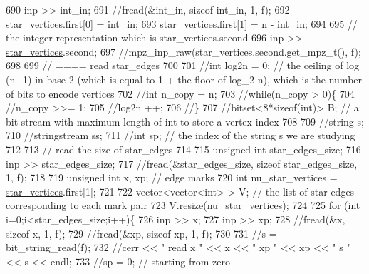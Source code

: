 \begin{DoxyCode}
690   inp >> int\_in;
691   \textcolor{comment}{//fread(&int\_in, sizeof int\_in, 1, f);}
692   \hyperlink{classmarked__graph__compressed_a7a4ced4586e2e353f9076bd447df5208}{star\_vertices}.first[0] = int\_in;
693   \hyperlink{classmarked__graph__compressed_a7a4ced4586e2e353f9076bd447df5208}{star\_vertices}.first[1] = \hyperlink{classmarked__graph__compressed_a8d841016ddb11cfd33748c8deb6277ba}{n} - int\_in;
694 
695   \textcolor{comment}{// the integer representation which is star\_vertices.second}
696   inp >> \hyperlink{classmarked__graph__compressed_a7a4ced4586e2e353f9076bd447df5208}{star\_vertices}.second;
697   \textcolor{comment}{//mpz\_inp\_raw(star\_vertices.second.get\_mpz\_t(), f);}
698 
699   \textcolor{comment}{// ==== read star\_edges}
700 
701   \textcolor{comment}{//int log2n = 0; // the ceiling of log (n+1) in base 2 (which is equal to 1 + the floor of log\_2 n),
       which is the number of bits to encode vertices}
702   \textcolor{comment}{//int n\_copy = n;}
703   \textcolor{comment}{//while(n\_copy > 0)\{}
704   \textcolor{comment}{//n\_copy >>= 1;}
705   \textcolor{comment}{//log2n ++;}
706   \textcolor{comment}{//\}}
707   \textcolor{comment}{//bitset<8*sizeof(int)> B; // a bit stream with maximum length of int to store a vertex index}
708 
709   \textcolor{comment}{//string s;}
710   \textcolor{comment}{//stringstream ss;}
711   \textcolor{comment}{//int sp; // the index of the string s we are studying }
712 
713   \textcolor{comment}{// read the size of star\_edges}
714 
715   \textcolor{keywordtype}{unsigned} \textcolor{keywordtype}{int} star\_edges\_size;
716   inp >> star\_edges\_size;
717   \textcolor{comment}{//fread(&star\_edges\_size, sizeof star\_edges\_size, 1, f);}
718 
719   \textcolor{keywordtype}{unsigned} \textcolor{keywordtype}{int} x, xp; \textcolor{comment}{// edge marks}
720   \textcolor{keywordtype}{int} nu\_star\_vertices = \hyperlink{classmarked__graph__compressed_a7a4ced4586e2e353f9076bd447df5208}{star\_vertices}.first[1];
721 
722   vector<vector<int> > V; \textcolor{comment}{// the list of star edges corresponding to each mark pair}
723   V.resize(nu\_star\_vertices);
724 
725   \textcolor{keywordflow}{for} (\textcolor{keywordtype}{int} i=0;i<star\_edges\_size;i++)\{
726     inp >> x;
727     inp >> xp;
728     \textcolor{comment}{//fread(&x, sizeof x, 1, f);}
729     \textcolor{comment}{//fread(&xp, sizeof xp, 1, f);}
730   
731     \textcolor{comment}{//s = bit\_string\_read(f);}
732     \textcolor{comment}{//cerr << " read  x " << x << " xp " << xp << " s " << s << endl;}
733     \textcolor{comment}{//sp = 0; // starting from zero }

\end{DoxyCode}
